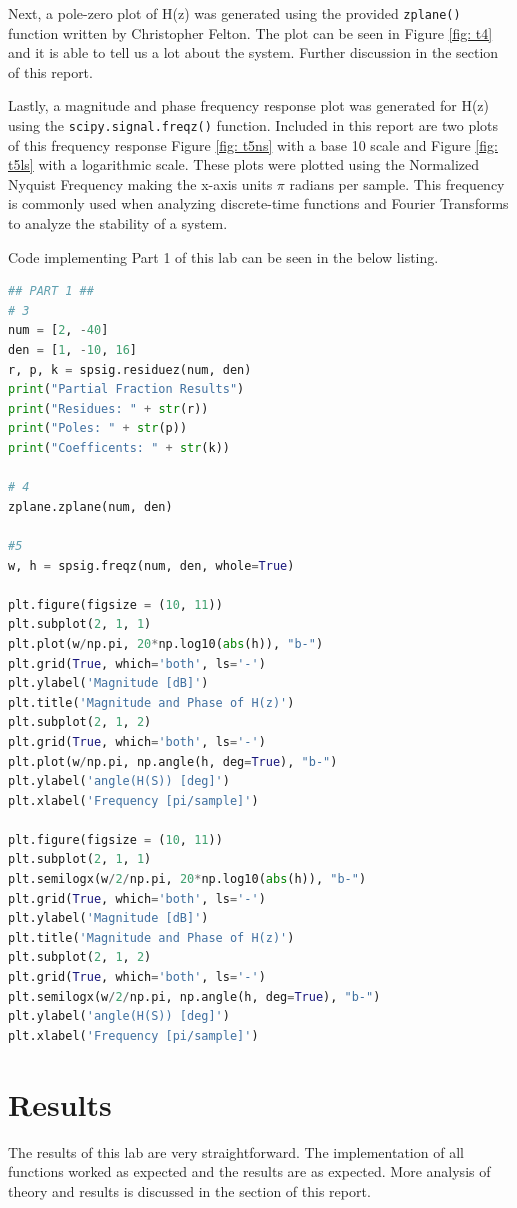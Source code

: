 \documentclass[12pt]{report}
\begin{document}
Next, a pole-zero plot of H(z) was generated using the provided \texttt{zplane()} function written by Christopher Felton.
The plot can be seen in Figure \ref{fig: t4} and it is able to tell us a lot about the system. Further discussion in 
the  section of this report.

Lastly, a magnitude and phase frequency response plot was generated for H(z) using the \texttt{scipy.signal.freqz()} function.
Included in this report are two plots of this frequency response Figure \ref{fig: t5ns} with a base 10 scale and Figure \ref{fig: t5ls}
with a logarithmic scale. These plots were plotted using the Normalized Nyquist Frequency making the x-axis units $\pi$ radians per sample.
This frequency is commonly used when analyzing discrete-time functions and Fourier Transforms to analyze the stability of a system.

Code implementing Part 1 of this lab can be seen in the below listing.

\begin{lstlisting}[language=Python, basicstyle=\footnotesize]
## PART 1 ##
# 3
num = [2, -40]
den = [1, -10, 16]
r, p, k = spsig.residuez(num, den)
print("Partial Fraction Results")
print("Residues: " + str(r))
print("Poles: " + str(p))
print("Coefficents: " + str(k))

# 4
zplane.zplane(num, den)

#5
w, h = spsig.freqz(num, den, whole=True)

plt.figure(figsize = (10, 11))
plt.subplot(2, 1, 1)
plt.plot(w/np.pi, 20*np.log10(abs(h)), "b-")
plt.grid(True, which='both', ls='-')
plt.ylabel('Magnitude [dB]')
plt.title('Magnitude and Phase of H(z)')
plt.subplot(2, 1, 2)
plt.grid(True, which='both', ls='-')
plt.plot(w/np.pi, np.angle(h, deg=True), "b-")
plt.ylabel('angle(H(S)) [deg]')
plt.xlabel('Frequency [pi/sample]')

plt.figure(figsize = (10, 11))
plt.subplot(2, 1, 1)
plt.semilogx(w/2/np.pi, 20*np.log10(abs(h)), "b-")
plt.grid(True, which='both', ls='-')
plt.ylabel('Magnitude [dB]')
plt.title('Magnitude and Phase of H(z)')
plt.subplot(2, 1, 2)
plt.grid(True, which='both', ls='-')
plt.semilogx(w/2/np.pi, np.angle(h, deg=True), "b-")
plt.ylabel('angle(H(S)) [deg]')
plt.xlabel('Frequency [pi/sample]')
\end{lstlisting}

\section{Results}\label{section: Results}
The results of this lab are very straightforward. The implementation of all functions worked as expected and the results are as expected.
More analysis of theory and results is discussed in the  section of this report.
\end{document}
